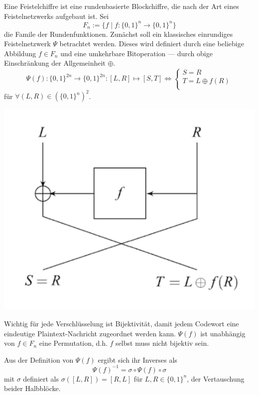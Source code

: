 \documentclass[course=erap]{aspdoc}
\begin{document}
Eine Feistelchiffre ist eine rundenbasierte Blockchiffre, die nach der Art eines Feistelnetzwerks aufgebaut ist. Sei
\[
    F_n := \{f \mid f \colon \{0, 1\}^n \to \{0, 1\}^n\}
\]
die Famile der Rundenfunktionen. Zunächst soll ein klassisches einrundiges Feistelnetzwerk $\Psi$ betrachtet werden. Dieses wird definiert durch eine beliebige Abbildung $f \in F_n$ und eine umkehrbare Bitoperation --- durch obige Einschränkung der Allgemeinheit $\oplus$.
\[
    \Psi(f) \colon \{0, 1\}^{2n} \to \{0, 1\}^{2n} \colon [L, R] \mapsto [S, T] \Leftrightarrow
        \begin{cases}
            S = R \\
            T = L \oplus f(R) \\
        \end{cases}
\]
für $\forall(L, R) \in (\{0, 1\}^n)^2$.\cite[p.11]{nachef}

\begin{center}
    \includegraphics[scale=1]{img/1_round_feistel_cipher_enc.png}\break
    \cite[Fig. 2.1]{nachef}
\end{center}

Wichtig für jede Verschlüsselung ist Bijektivität, damit jedem Codewort eine eindeutige Plaintext-Nachricht zugeordnet werden kann. $\Psi(f)$ ist unabhängig von $f \in F_n$ eine Permutation, d.h. $f$ selbst muss nicht bijektiv sein.\cite[p.12]{nachef}\bigbreak

Aus der Definition von $\Psi(f)$ ergibt sich ihr Inverses als
\[
    \Psi(f)^{-1} = \sigma \circ \Psi(f) \circ \sigma
\]
mit $\sigma$ definiert als $\sigma([L, R]) = [R, L]$ für $L, R \in \{0, 1\}^n$, der Vertauschung beider Halbblöcke.\cite[p.12]{nachef}
\end{document}
